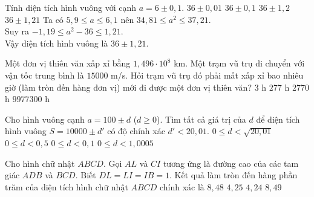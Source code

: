 \begin{ex}%
	Tính diện tích hình vuông với cạnh $a=6\pm 0{,}1$.
	\choice
	{$36\pm 0{,}01$}
	{$36\pm 0{,}1$}
	{$36\pm 1{,}2$}
	{\True $36\pm 1{,}21$}
	\loigiai
	{Ta có $5{,}9 \le a \le 6{,}1$ nên $34{,}81 \le a^2\le 37{,}21$.\\
		Suy ra $-1{,}19\le a^2-36\le 1{,}21$.\\
		Vậy diện tích hình vuông là $36\pm 1{,}21$.
	}
\end{ex}

\begin{ex}%
	Một đơn vị thiên văn xấp xỉ bằng $1{,}496\cdot 10^8$ km. Một trạm vũ trụ di chuyển với vận tốc trung bình là $15000$ m/s. Hỏi trạm vũ trụ đó phải mất xấp xỉ bao nhiêu giờ (làm tròn đến hàng đơn vị) mới đi được một đơn vị thiên văn?
	\choice
	{$3$ h}
	{$277$ h}
	{\True $2770$ h}
	{$9977300$ h}
\end{ex}

\begin{ex}%
	Cho hình vuông cạnh $a= 100\pm d$ ($ d\ge 0 $). Tìm tất cả giá trị của $ d $ để diện tích hình vuông $S = 10000\pm d'$ có độ chính xác $d'<20{,}01$.
	\choice
	{$0\le d<\sqrt{20{,}01}$}
	{$0\le d<0{,}5$}
	{\True $0\le d<0{,}1$}
	{$0\le d<1{,}0005$}
\end{ex}

\begin{ex}%
	Cho hình chữ nhật $ABCD$. Gọi $AL$ và $CI$ tương ứng là đường cao của các tam giác $ADB$ và $BCD$. Biết $DL=LI=IB=1$. Kết quả làm tròn đến hàng phần trăm của diện tích hình chữ nhật $ ABCD $ chính xác là
	\choice
	{$8{,}48$}
	{$4{,}25$}
	{\True $4{,}24$}
	{$8{,}49$}
\end{ex}

